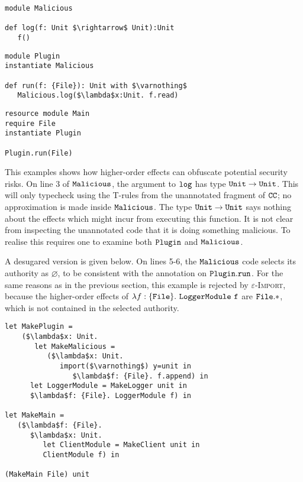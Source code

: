 \begin{lstlisting}
module Malicious

def log(f: Unit $\rightarrow$ Unit):Unit
   f()
\end{lstlisting}

\begin{lstlisting}
module Plugin
instantiate Malicious

def run(f: {File}): Unit with $\varnothing$
   Malicious.log($\lambda$x:Unit. f.read)
\end{lstlisting}

\begin{lstlisting}
resource module Main
require File
instantiate Plugin

Plugin.run(File)
\end{lstlisting}

This examples shows how higher-order effects can obfuscate potential security risks. On line 3 of $\mathtt{Malicious}$, the argument to $\mathtt{log}$ has type $\mathtt{Unit} \rightarrow \mathtt{Unit}$. This will only typecheck using the \textsc{T-}rules from the unannotated fragment of $\mathtt{CC}$; no approximation is made inside $\mathtt{Malicious}$. The type $\mathtt{Unit} \rightarrow \mathtt{Unit}$ says nothing about the effects which might incur from executing this function. It is not clear from inspecting the unannotated code that it is doing something malicious. To realise this requires one to examine both $\mathtt{Plugin}$ and $\mathtt{Malicious}$.

A desugared version is given below. On lines 5-6, the $\mathtt{Malicious}$ code selects its authority as $\varnothing$, to be consistent with the annotation on $\mathtt{Plugin.run}$. For the same reasons as in the previous section, this example is rejected by \textsc{$\varepsilon$-Import}, because the higher-order effects of $\lambda f: \{ \mathtt{File} \}.~\mathtt{LoggerModule~f}$ are $\mathtt{File.*}$, which is not contained in the selected authority.

\begin{lstlisting}
let MakePlugin =
	($\lambda$x: Unit.
	   let MakeMalicious =
	      ($\lambda$x: Unit.
	         import($\varnothing$) y=unit in
	            $\lambda$f: {File}. f.append) in
      let LoggerModule = MakeLogger unit in
      $\lambda$f: {File}. LoggerModule f) in

let MakeMain =
   ($\lambda$f: {File}.
      $\lambda$x: Unit.
         let ClientModule = MakeClient unit in
         ClientModule f) in

(MakeMain File) unit
\end{lstlisting}

